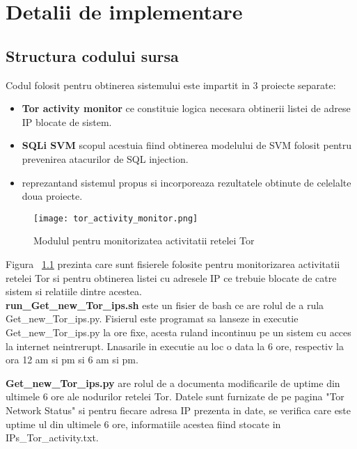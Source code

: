  \chapter{Detalii de implementare}
\label{cap:implementare}


\section{Structura codului sursa}

Codul folosit pentru obtinerea sistemului \textit{\thesistitle} este impartit in 3 proiecte separate:
\begin{itemize}
	\item \textbf{Tor activity monitor} ce constituie logica necesara obtinerii listei de adrese IP blocate de sistem.
	\item \textbf{SQLi SVM} scopul acestuia fiind obtinerea modelului de SVM folosit pentru prevenirea atacurilor de SQL injection.
	\item \textbf{\thesistitle} reprezantand sistemul propus si incorporeaza rezultatele obtinute de celelalte doua proiecte.
\end{itemize}

\begin{figure}[h]
	\centering
	\texttt{[image: tor\_activity\_monitor.png]}
	\caption{Modulul pentru monitorizatea activitatii retelei Tor}
	\label{fig:tor_activity_monitor}
\end{figure}

Figura ~\ref{fig:tor_activity_monitor} prezinta care sunt fisierele folosite pentru monitorizarea activitatii retelei Tor si pentru obtinerea listei cu adresele IP ce trebuie blocate de catre sistem si relatiile dintre acestea. \\

\textbf{run\_Get\_new\_Tor\_ips.sh} este un fisier de bash ce are rolul de a rula Get\_new\_Tor\_ips.py. Fisierul este programat sa lanseze in executie Get\_new\_Tor\_ips.py la ore fixe, acesta ruland incontinuu pe un sistem cu acces la internet neintrerupt. Lnasarile in executie au loc o data la 6 ore, respectiv la ora 12 am si pm si 6 am si pm.

\textbf{Get\_new\_Tor\_ips.py} are rolul de a documenta modificarile de uptime din ultimele 6 ore ale nodurilor retelei Tor. Datele sunt furnizate de pe pagina "Tor Network Status" \cite{tot_status} si pentru fiecare adresa IP prezenta in date, se verifica care este uptime ul din ultimele 6 ore, informatiile acestea fiind stocate in IPs\_Tor\_activity.txt.

